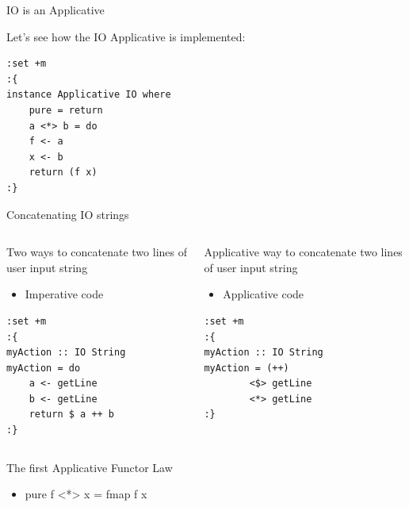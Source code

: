 \documentclass[presetation]{beamer}
\begin{document}
\begin{frame}[fragile,label={sec:orgf35be05}]{IO is an Applicative}
 \begin{block}{Let's see how the IO Applicative is implemented:}
\begin{verbatim}
:set +m
:{
instance Applicative IO where
    pure = return
    a <*> b = do
	f <- a
	x <- b
	return (f x)
:}
\end{verbatim}
\end{block}
\end{frame}

\begin{frame}[fragile,label={sec:org189d07e}]{Concatenating IO strings}
 \begin{columns}
\begin{column}{.48\columnwidth}
\begin{block}{Two ways to concatenate two lines of user input string}
\begin{itemize}
\item Imperative code
\end{itemize}
\begin{verbatim}
:set +m
:{
myAction :: IO String
myAction = do
    a <- getLine
    b <- getLine
    return $ a ++ b
:}
\end{verbatim}
\end{block}
\end{column}

\begin{column}{.48\columnwidth}
\begin{block}{Applicative way to concatenate two lines of user input string}
\begin{itemize}
\item Applicative code
\end{itemize}
\begin{verbatim}
:set +m
:{
myAction :: IO String
myAction = (++) 
	    <$> getLine 
	    <*> getLine
:}
\end{verbatim}
\end{block}
\end{column}
\end{columns}
\end{frame}

\begin{frame}[label={sec:org8cee5e2}]{The first Applicative Functor Law}
\begin{theorem}
\begin{itemize}
\item pure f <*> x = fmap f x
\end{itemize}
\end{theorem}
\end{frame}
\end{document}
